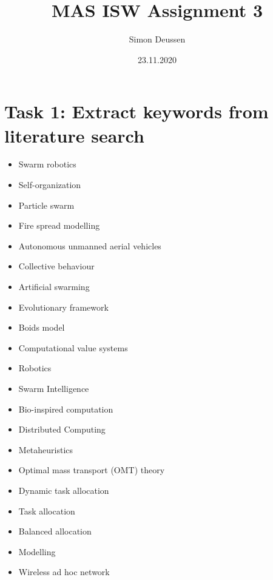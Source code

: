 \documentclass{article}
\title{MAS ISW Assignment 3}
\date{23.11.2020}
\author{Simon Deussen}
\begin{document}
  \maketitle

  \section*{Task 1: Extract keywords from literature search}

  \begin{itemize}
    \item Swarm robotics \cite{INNOCENTE201980} \cite{OSABA2020101049} \cite{WANG2020} \cite{KONUR2012199} \cite{Winfield_2008}
    \item Self-organization \cite{INNOCENTE201980}
    \item Particle swarm \cite{INNOCENTE201980}
    \item Fire spread modelling \cite{INNOCENTE201980}
    \item Autonomous unmanned aerial vehicles \cite{INNOCENTE201980} \cite{8424838}
    \item Collective behaviour \cite{KHAN2020100715}
    \item Artificial swarming \cite{KHAN2020100715}
    \item Evolutionary framework \cite{KHAN2020100715}
    \item Boids model \cite{KHAN2020100715}
    \item Computational value systems \cite{KHAN2020100715}
    \item Robotics \cite{OSABA2020101049}
    \item Swarm Intelligence \cite{OSABA2020101049}
    \item Bio-inspired computation \cite{OSABA2020101049}
    \item Distributed Computing \cite{OSABA2020101049}
    \item Metaheuristics \cite{OSABA2020101049}
    \item Optimal mass transport (OMT) theory \cite{WANG2020}
    \item Dynamic task allocation \cite{WANG2020} \cite{8424838}
    \item Task allocation \cite{WANG2020} \cite{8424838}
    \item Balanced allocation \cite{WANG2020}
    \item Modelling \cite{Winfield_2008}
    \item Wireless ad hoc network \cite{Winfield_2008}

\end{itemize}
\end{document}
